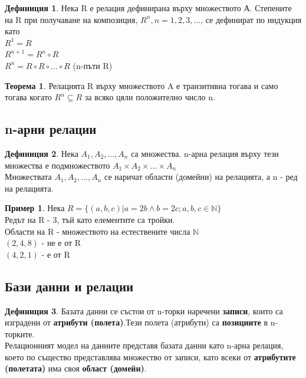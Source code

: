 \documentclass[fleqn, 12pt]{article}
\theoremstyle{definition}
\newtheorem{example}{Пример}[subsection]
\newtheorem{definition}{Дефиниция}[subsection]
\newtheorem{theorem}{Теорема}[subsection]
\begin{document}
\begin{definition}
Нека R е релация дефинирана върху множеството А. Степените на R при получаване на композиция, $R^n, n = 1, 2, 3, ...$, се дефинират по индукция като \\
$R^1 = R$ \\
$R^{n+1} = R^n \circ R$ \\
$R^n = R \circ R \circ ... \circ R$ (n-пъти R)
\end{definition}

\begin{theorem}
Релацията R върху множеството A е транзитивна тогава и само тогава когато $R^n \subseteq R$ за всяко цяли положително число n.
\end{theorem}

\subsection{n-арни релации}

\begin{definition}
Нека $A_1, A_2, ..., A_n$ са множества. n-арна релация върху тези множества е подмножеството $A_1 \times A_2 \times ... \times A_n$ \\
Множествата $A_1, A_2, ..., A_n$ се наричат области (домейни) на релацията, а n - ред на релацията. 
\end{definition}

\begin{example}
Нека  $R = \{ (a, b, c) | a = 2b \land b = 2c; a,b,c \in \mathbb{N} \}$\\
Редът на R - 3, тъй като елементите са тройки. \\
Области на R - множеството на естествените числа $\mathbb{N}$ \\
$(2, 4, 8)$ - не е от R \\
$(4, 2, 1)$ - е от R
\end{example}

\subsection{Бази данни и релации}

\begin{definition}
Базата данни се състои от n-торки  наречени \textbf{записи}, които са изградени от \textbf{атрибути (полета)}.Тези полета (атрибути) са \textbf{позициите} в n-торките.\\
Релационният модел на данните представя базата данни като n-арна релация, което по същество представлява множество от записи, като всеки от \textbf{атрибутите (полетата)} има своя \textbf{област (домейн)}.
\end{definition}
\end{document}
